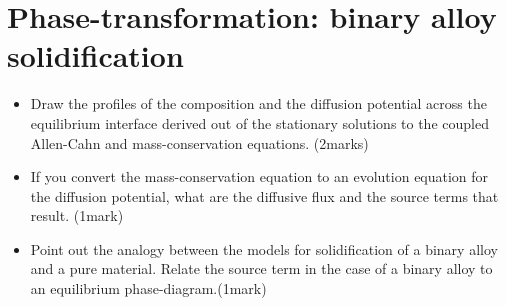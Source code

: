 \documentclass[a4paper,10pt]{article}
\begin{document}
\section{Phase-transformation: binary alloy solidification}

\begin{itemize}
 \item Draw the profiles of the composition and the diffusion potential across the equilibrium interface derived out of the 
 stationary solutions to the coupled Allen-Cahn and mass-conservation equations. (2marks)
 \item If you convert the mass-conservation equation to an evolution equation for the diffusion potential, what are 
 the diffusive flux and the source terms that result. (1mark)
 \item Point out the analogy between the models for solidification of a binary alloy and a pure material. Relate the 
 source term in the case of a binary alloy to an equilibrium phase-diagram.(1mark)
\end{itemize}
\end{document}
